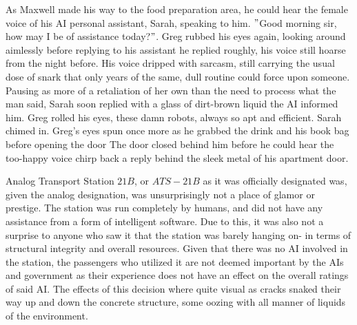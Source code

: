 As Maxwell made his way to the food preparation area, he could hear the female voice of his AI personal assistant, Sarah, speaking to him.
\("\)Good morning sir, how may I be of assistance today?\("\).
Greg rubbed his eyes again, looking around aimlessly before replying to his assistant  he replied roughly, his voice still hoarse from the night before.
His voice dripped with sarcasm, still carrying the usual dose of snark that only years of the same, dull routine could force upon someone.
Pausing as more of a retaliation of her own than the need to process what the man said, Sarah soon replied with a glass of dirt-brown liquid 
the AI informed him.  Greg rolled his eyes, these damn robots, always so apt and efficient.
 Sarah chimed in. 
Greg’s eyes spun once more as he grabbed the drink and his book bag before opening the door 
The door closed behind him before he could hear the too-happy voice chirp back a reply behind the sleek metal of his apartment door.

\dinkus
Analog Transport Station $21B$, or  $ATS-21B$ as it was officially designated was, given the analog designation, was unsurprisingly not a place of glamor or prestige.
The station was run completely by humans, and did not have any assistance from a form of intelligent software.%
Due to this, it was also not a surprise to anyone who saw it that the station was barely hanging on- in terms of structural integrity and overall resources.
Given that there was no AI involved in the station, the passengers who utilized it are not deemed important by the AIs
and government as their experience does not have an effect on the overall ratings of said AI\@.
The effects of this decision where quite visual as cracks snaked their way up and down the concrete structure, some oozing with all manner of liquids of the environment.
